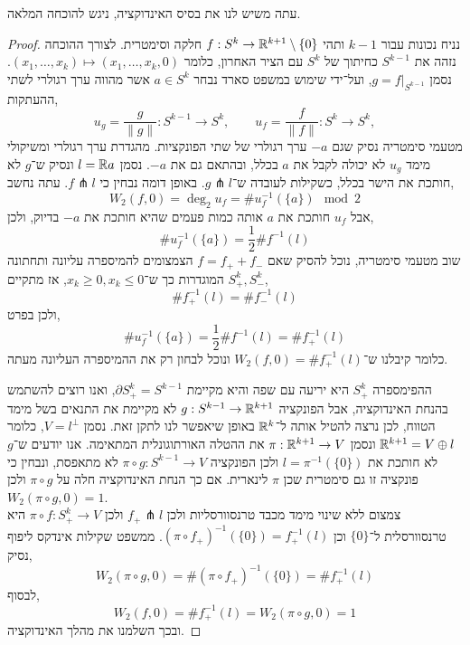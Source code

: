 עתה משיש לנו את בסיס האינדוקציה, ניגש להוכחה המלאה.
\begin{proof}
	נניח נכונות עבור $k - 1$ ותהי $f : S^k \to \mathbb{R}^{k + 1} \setminus \{ 0 \}$ חלקה וסימטרית.
	לצורך ההוכחה נזהה את $S^{k - 1}$ כחיתוך של $S^k$ עם הציר האחרון, כלומר $(x_1, \ldots, x_k) \mapsto (x_1, \ldots, x_k, 0)$.
	נסמן $g = f |_{S^{k - 1}}$, ועל־ידי שימוש במשפט סארד נבחר $a \in S^k$ אשר מהווה ערך רגולרי לשתי ההעתקות,
	\[
		u_g = \frac{g}{\lVert g \rVert} : S^{k - 1} \to S^k,
		\qquad
		u_f = \frac{f}{\lVert f \rVert} : S^k \to S^k,
	\]
	מטעמי סימטריה נסיק שגם $-a$ ערך רגולרי של שתי הפונקציות.
	מהגדרת ערך רגולרי ומשיקולי מימד $u_g$ לא יכולה לקבל את $a$ בכלל, ובהתאם גם את $-a$.
	נסמן $l = \mathbb{R} a$ ונסיק ש־$g$ לא חותכת את הישר בכלל, כשקילות לעובדה ש־$g \pitchfork  l$.
	באופן דומה נבחין כי $f \pitchfork l$.
	עתה נחשב,
	\[
		W_2(f, 0)
		= \deg_2 u_f
		= \# u_f^{-1}(\{ a \}) \mod 2
	\]
	אבל $u_f$ חותכת את $a$ אותה כמות פעמים שהיא חותכת את $-a$ בדיוק, ולכן,
	\[
		\# u_f^{-1}(\{ a \})
		= \frac{1}{2} \# f^{-1}(l)
	\]
	שוב מטעמי סימטריה, נוכל להסיק שאם $f = f_+ + f_-$ הצמצומים להמיספרה עליונה ותחתונה $S_+^k, S_-^k$ המוגדרות כך ש־$x_k \ge 0, x_k \le 0$,
	אז מתקיים,
	\[
		\# f_+^{-1}(l)
		= \# f_-^{-1}(l)
	\]
	ולכן בפרט,
	\[
		\# u_f^{-1}(\{ a \})
		= \frac{1}{2} \# f^{-1}(l)
		= \# f_+^{-1}(l)
	\]
	כלומר קיבלנו ש־$W_2(f, 0) = \# f_+^{-1}(l)$ ונוכל לבחון רק את ההמיספרה העליונה מעתה.

	ההפימספרה $S_+^k$ היא יריעה עם שפה והיא מקיימת $\partial S_+^k = S^{k - 1}$, ואנו רוצים להשתמש בהנחת האינדוקציה,
	אבל הפונקציה $g : S^{k - 1} \to \mathbb{R}^{k + 1}$ לא מקיימת את התנאים בשל מימד הטווח, לכן נרצה להטיל אותה ל־$\mathbb{R}^k$ באופן שיאפשר לנו לתקן זאת.
	נסמן $V = l^\perp$, כלומר $\mathbb{R}^{k + 1} = V \oplus l$ ונסמן $\pi : \mathbb{R}^{k + 1} \to V$ את ההטלה האורתוגונלית המתאימה.
	אנו יודעים ש־$g$ לא חותכת את $l = \pi^{-1}(\{ 0 \})$ ולכן הפונקציה $\pi \circ g : S^{k - 1} \to V$ לא מתאפסת, ונבחין כי פונקציה זו גם סימטרית שכן $\pi$ לינארית.
	אם כך הנחת האינדוקציה חלה על $\pi \circ g$ ולכן $W_2(\pi \circ g, 0) = 1$. \\
	צמצום ללא שינוי מימד מכבד טרנסוורסליות ולכן $f_+ \pitchfork l$ ולכן $\pi \circ f : S_+^k \to V$ היא טרנסוורסלית ל־$\{ 0 \}$ וכן ${(\pi \circ f_+)}^{-1}(\{ 0 \}) = f_+^{-1}(l)$.
	ממשפט שקילות אינדקס ליפוף נסיק,
	\[
		W_2(\pi \circ g, 0)
		= \# {(\pi \circ f_+)}^{-1}(\{ 0 \})
		= \# f_+^{-1}(l)
	\]
	לבסוף,
	\[
		W_2(f, 0)
		= \# f_+^{-1}(l)
		= W_2(\pi \circ g, 0)
		= 1
	\]
	ובכך השלמנו את מהלך האינדוקציה.
\end{proof}


